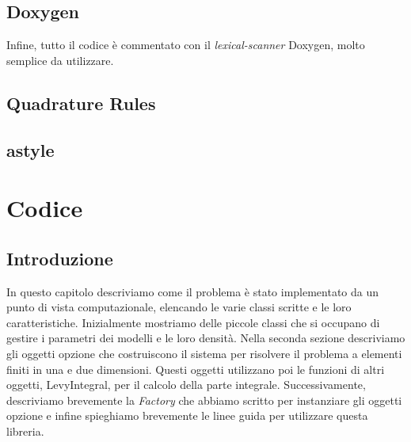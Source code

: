 \documentclass[a4paper,10pt]{report}
\theoremstyle{plain}
\theoremstyle{definition}
\theoremstyle{remark}
\begin{document}
\section{\textsf{Doxygen}}
Infine, tutto il codice \`e commentato con il \emph{lexical-scanner} \textsf{Doxygen}, molto semplice da utilizzare. 
\section{Quadrature Rules}
\section{astyle}
\chapter{Codice}
\section{Introduzione}
In questo capitolo descriviamo come il problema \`e stato implementato da un punto di vista computazionale, elencando le varie classi scritte e le loro caratteristiche. Inizialmente mostriamo delle piccole classi che si occupano di gestire i parametri dei modelli e le loro densit\`a. Nella seconda sezione descriviamo gli oggetti opzione che costruiscono il sistema per risolvere il problema a elementi finiti in una e due dimensioni. Questi oggetti utilizzano poi le funzioni di altri oggetti, \textsf{LevyIntegral}, per il calcolo della parte integrale. Successivamente, descriviamo brevemente la \emph{Factory} che abbiamo scritto per instanziare gli oggetti opzione e infine spieghiamo brevemente le linee guida per utilizzare questa libreria.
\end{document}
